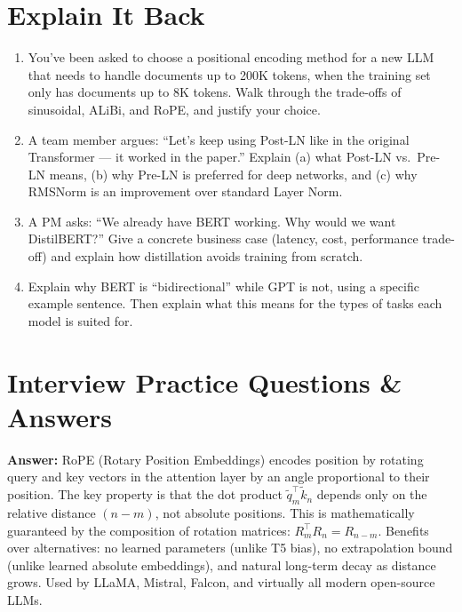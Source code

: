 \documentclass[11pt, a4paper]{article}
\begin{document}
\newpage
\section{Explain It Back}

\begin{enumerate}[leftmargin=2em]
  \item You've been asked to choose a positional encoding method for a new LLM that needs to handle documents up to 200K tokens, when the training set only has documents up to 8K tokens. Walk through the trade-offs of sinusoidal, ALiBi, and RoPE, and justify your choice.

  \item A team member argues: ``Let's keep using Post-LN like in the original Transformer --- it worked in the paper.'' Explain (a) what Post-LN vs.\ Pre-LN means, (b) why Pre-LN is preferred for deep networks, and (c) why RMSNorm is an improvement over standard Layer Norm.

  \item A PM asks: ``We already have BERT working. Why would we want DistilBERT?'' Give a concrete business case (latency, cost, performance trade-off) and explain how distillation avoids training from scratch.

  \item Explain why BERT is ``bidirectional'' while GPT is not, using a specific example sentence. Then explain what this means for the types of tasks each model is suited for.
\end{enumerate}

\newpage
\section{Interview Practice Questions \& Answers}

\begin{notebox}
\textbf{Answer:} RoPE (Rotary Position Embeddings) encodes position by rotating query and key vectors in the attention layer by an angle proportional to their position. The key property is that the dot product $\tilde{q}_m^\top \tilde{k}_n$ depends only on the relative distance $(n-m)$, not absolute positions. This is mathematically guaranteed by the composition of rotation matrices: $R_m^\top R_n = R_{n-m}$. Benefits over alternatives: no learned parameters (unlike T5 bias), no extrapolation bound (unlike learned absolute embeddings), and natural long-term decay as distance grows. Used by LLaMA, Mistral, Falcon, and virtually all modern open-source LLMs.
\end{notebox}
\end{document}

